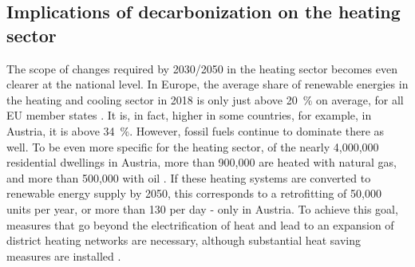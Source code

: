 \subsection{Implications of decarbonization on the heating sector}
The scope of changes required by 2030/2050 in the heating sector becomes even clearer at the national level. In Europe, the average share of renewable energies in the heating and cooling sector in 2018 is only just above \SI{20}{\%} on average, for all EU member states \cite{eurostat_reference}. It is, in fact, higher in some countries, for example, in Austria, it is above \SI{34}{\%}. However, fossil fuels continue to dominate there as well. To be even more specific for the heating sector, of the nearly 4,000,000 residential dwellings in Austria, more than 900,000 are heated with natural gas, and more than 500,000 with oil \cite{statistik_austria}. If these heating systems are converted to renewable energy supply by 2050, this corresponds to a retrofitting of 50,000 units per year, or more than 130 per day - only in Austria. To achieve this goal, measures that go beyond the electrification of heat and lead to an expansion of district heating networks are necessary, although substantial heat saving measures are installed \cite{jalil2018spatially}.\vspace{0.3cm}

